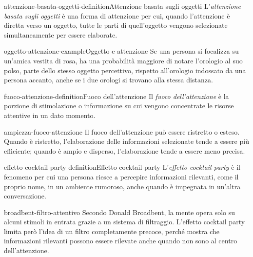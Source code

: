 \documentclass[preview]{standalone}
\begin{document}

\begin{snippetdefinition}{attenzione-basata-oggetti-definition}{Attenzione basata sugli oggetti}
    L'\emph{attenzione basata sugli oggetti} è una forma di attenzione per cui,
    quando l'attenzione è diretta verso un oggetto, tutte le parti di quell'oggetto
    vengono selezionate simultaneamente per essere elaborate.
\end{snippetdefinition}

\begin{snippetexample}{oggetto-attenzione-example}{Oggetto e attenzione}
    Se una persona si focalizza su un'amica vestita di rosa, ha una probabilità
    maggiore di notare l'orologio al suo polso, parte dello stesso oggetto
    percettivo, rispetto all'orologio indossato da una persona accanto, anche se
    i due orologi si trovano alla stessa distanza.
\end{snippetexample}

\begin{snippetdefinition}{fuoco-attenzione-definition}{Fuoco dell'attenzione}
    Il \emph{fuoco dell'attenzione} è la porzione di stimolazione o informazione
    su cui vengono concentrate le risorse attentive in un dato momento.
\end{snippetdefinition}

\begin{snippet}{ampiezza-fuoco-attenzione}
    Il fuoco dell'attenzione può essere ristretto o esteso. Quando è ristretto,
    l'elaborazione delle informazioni selezionate tende a essere più efficiente;
    quando è ampio e disperso, l'elaborazione tende a essere meno precisa.
\end{snippet}

\begin{snippetdefinition}{effetto-cocktail-party-definition}{Effetto cocktail party}
    L'\emph{effetto cocktail party} è il fenomeno per cui una persona riesce a
    percepire informazioni rilevanti, come il proprio nome, in un ambiente
    rumoroso, anche quando è impegnata in un'altra conversazione.
\end{snippetdefinition}

\begin{snippet}{broadbent-filtro-attentivo}
    Secondo Donald Broadbent, la mente opera solo su alcuni stimoli in entrata
    grazie a un sistema di filtraggio. L'effetto cocktail party limita però
    l'idea di un filtro completamente precoce, perché mostra che informazioni
    rilevanti possono essere rilevate anche quando non sono al centro
    dell'attenzione.
\end{snippet}
\end{document}
